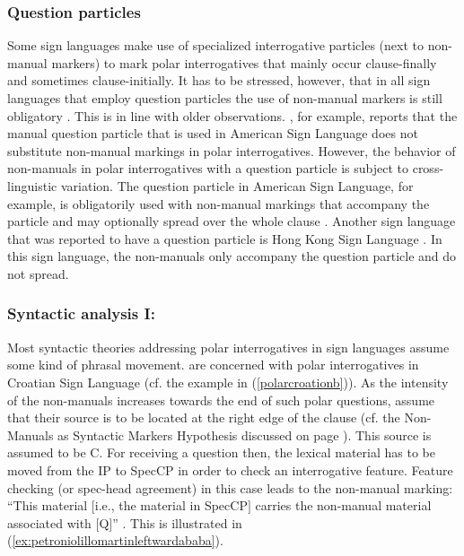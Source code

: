 \subsubsection{Question particles}
Some sign languages make use of specialized interrogative particles (next to non-manual markers) to mark polar interrogatives that mainly occur clause-finally and sometimes clause-initially. It has to be stressed, however, that in all sign languages that employ question particles the use of non-manual markers is still obligatory \citep[21]{zeshan2004interrogative}. This is in line with older observations. \citet{liddell1977non}, for example, reports that the manual question particle that is used in American Sign Language does not substitute non-manual markings in polar interrogatives. However, the behavior of non-manuals in polar interrogatives with a question particle is subject to cross-linguistic variation. The question particle in American Sign Language, for example, is obligatorily used with non-manual markings that accompany the particle and may optionally spread over the  whole clause \citep[122--124]{neidle2000syntax}. Another sign language that was reported to have a question particle is Hong Kong Sign Language \citep[206]{tang2006questions}. In this sign language, the non-manuals only accompany the question particle and do not spread. 

\subsubsection{Syntactic analysis I: \citet{sarac2006interrogative}}
Most syntactic theories addressing polar interrogatives in sign languages assume some kind of phrasal movement. \citet{sarac2006interrogative} are concerned with polar interrogatives in Croatian Sign Language (cf. the example in (\ref{polarcroationb})). 
As the intensity of the non-manuals increases towards the end of such polar questions, \citet{sarac2006interrogative} assume that their source is to be located at the right edge of the clause (cf. the Non-Manuals as Syntactic Markers Hypothesis discussed on page \pageref{nmasmh}). This source is assumed to be C\textdegree . For receiving a question then, the lexical material has to be moved from the IP to SpecCP in order to check an interrogative feature. Feature checking (or spec-head agreement) in this case leads to the non-manual marking: ``This material $[$i.e., the material in SpecCP$]$ carries the non-manual material associated with $[$Q$]$'' \citep[222]{sarac2006interrogative}. This is illustrated in (\ref{ex:petroniolillomartinleftwardababa}).


